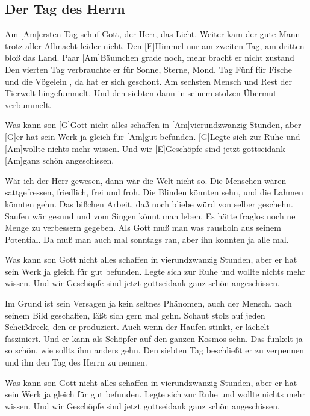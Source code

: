 \subsection*{Der Tag des Herrn   }
\begin{guitar}

    Am [Am]ersten Tag schuf Gott, der Herr, das Licht. 
    Weiter kam der gute Mann trotz aller Allmacht leider nicht. 
    Den [E]Himmel nur am zweiten Tag, am dritten bloß das Land. 
    Paar [Am]Bäumchen grade noch, mehr bracht er nicht zustand 
    Den vierten Tag verbrauchte er für Sonne, Sterne, Mond. 
    Tag Fünf für Fische und die Vögelein , da hat er sich geschont. 
    Am sechsten Mensch und Rest der Tierwelt hingefummelt. 
    Und den siebten dann in seinem stolzen Übermut verbummelt.


    Was kann son [G]Gott nicht alles schaffen in [Am]vierundzwanzig Stunden, 
    aber [G]er hat sein Werk ja gleich für [Am]gut befunden. 
    [G]Legte sich zur Ruhe und [Am]wollte nichts mehr wissen. 
    Und wir [E]Geschöpfe sind jetzt gottseidank [Am]ganz schön angeschissen. 


    Wär ich der Herr gewesen, dann wär die Welt nicht so. 
    Die Menschen wären sattgefressen, friedlich, frei und froh. 
    Die Blinden könnten sehn, und die Lahmen könnten gehn. 
    Das bißchen Arbeit, daß noch bliebe würd von selber geschehn.
    Saufen wär gesund und vom Singen könnt man leben. 
    Es hätte fraglos noch ne Menge zu verbessern gegeben. 
    Als Gott muß man was rausholn aus seinem Potential. 
    Da muß man auch mal sonntags ran, aber ihn konnten ja alle mal.


    Was kann son Gott nicht alles schaffen in vierundzwanzig Stunden, 
    aber er hat sein Werk ja gleich für gut befunden. 
    Legte sich zur Ruhe und wollte nichts mehr wissen. 
    Und wir Geschöpfe sind jetzt gottseidank ganz schön angeschissen.


    Im Grund ist sein Versagen ja kein seltnes Phänomen, 
    auch der Mensch, nach seinem Bild geschaffen, läßt sich gern mal gehn. 
    Schaut stolz auf jeden Scheißdreck, den er produziert. 
    Auch wenn der Haufen stinkt, er lächelt fasziniert.
    Und er kann als Schöpfer auf den ganzen Kosmos sehn. 
    Das funkelt ja so schön, wie sollts ihm anders gehn. 
    Den siebten Tag beschließt er zu verpennen 
    und ihn den Tag des Herrn zu nennen. 


    Was kann son Gott nicht alles schaffen in vierundzwanzig Stunden, 
    aber er hat sein Werk ja gleich für gut befunden. 
    Legte sich zur Ruhe und wollte nichts mehr wissen. 
    Und wir Geschöpfe sind jetzt gottseidank ganz schön angeschissen. 


\end{guitar}

